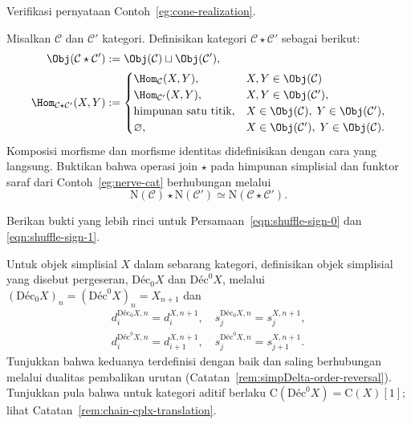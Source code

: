 \begin{Exercises}
	\item Verifikasi pernyataan Contoh~\ref{eg:cone-realization}.

	\item Misalkan $\mathcal{C}$ dan $\mathcal{C}'$ kategori. Definisikan
	kategori $\mathcal{C}\star\mathcal{C}'$ sebagai berikut:
	\begin{align*}
		\Obj(\mathcal{C} \star \mathcal{C}') & := \Obj(\mathcal{C}) \sqcup \Obj(\mathcal{C}'), \\
		\Hom_{\mathcal{C} \star \mathcal{C}'}(X, Y) & := \begin{cases}
			\Hom_{\mathcal{C}}(X, Y), & X, Y \in \Obj(\mathcal{C}) \\
			\Hom_{\mathcal{C}'}(X, Y), & X, Y \in \Obj(\mathcal{C}'), \\
			\text{himpunan satu titik}, & X \in \Obj(\mathcal{C}), \; Y \in \Obj(\mathcal{C}'), \\
			\emptyset, & X \in \Obj(\mathcal{C}'), \; Y \in \Obj(\mathcal{C}).
		\end{cases}
	\end{align*}
	Komposisi morfisme dan morfisme identitas didefinisikan dengan cara yang
	langsung. Buktikan bahwa operasi join $\star$ pada himpunan simplisial dan
	funktor saraf dari Contoh~\ref{eg:nerve-cat} berhubungan melalui
	\[ \mathrm{N}(\mathcal{C}) \star \mathrm{N}(\mathcal{C}') \simeq \mathrm{N}(\mathcal{C} \star \mathcal{C}'). \]

	\item Berikan bukti yang lebih rinci untuk
	Persamaan~\eqref{eqn:shuffle-sign-0} dan
	\eqref{eqn:shuffle-sign-1}.

	\item Untuk objek simplisial $X$ dalam sebarang kategori, definisikan
	objek simplisial yang disebut pergeseran, $\mathrm{Déc}_0X$ dan
	$\mathrm{Déc}^0X$, melalui
	$(\mathrm{Déc}_0X)_n=(\mathrm{Déc}^0X)_n=X_{n+1}$ dan
	\begin{gather*}
		d^{\mathrm{Déc}_0 X, n}_i = d^{X, n+1}_i, \quad s^{\mathrm{Déc}_0 X, n}_j = s^{X, n+1}_j, \\
		d^{\mathrm{Déc}^0 X, n}_i = d^{X, n+1}_{i+1}, \quad
		s^{\mathrm{Déc}^0 X, n}_j = s^{X, n+1}_{j+1}.
	\end{gather*}
	Tunjukkan bahwa keduanya terdefinisi dengan baik dan saling berhubungan
	melalui dualitas pembalikan urutan
	(Catatan~\ref{rem:simpDelta-order-reversal}). Tunjukkan pula bahwa untuk
	kategori aditif berlaku
	$\mathrm{C}(\mathrm{Déc}^0X)=\mathrm{C}(X)[1]$; lihat
	Catatan~\ref{rem:chain-cplx-translation}.


\end{Exercises}
